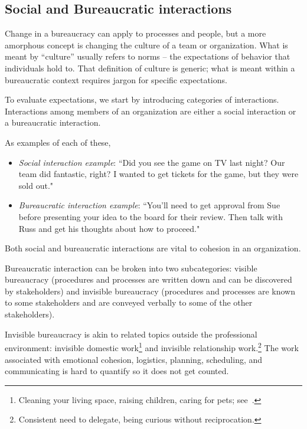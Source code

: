
\subsection*{Social and Bureaucratic interactions\label{sec:socializing}}

Change in a bureaucracy can apply to processes and people, but a more amorphous concept is changing the culture of a team or organization. What is meant by ``culture'' usually refers to norms -- the expectations of behavior that individuals hold to. That definition of culture is generic; what is meant within a bureaucratic context requires jargon for specific expectations.

To evaluate expectations, we start by introducing categories of interactions. 
Interactions among members of an organization are either a social interaction or a bureaucratic interaction. 

As examples of each of these,
\begin{itemize}
\item \textit{Social interaction example}: ``Did you see the game on TV last night? Our team did fantastic, right? I wanted to get tickets for the game, but they were sold out."
\item \textit{Bureaucratic interaction example}: ``You'll need to get approval from Sue before presenting your idea to the board for their review. Then talk with Russ and get his thoughts about how to proceed."
\end{itemize}
Both social and bureaucratic interactions are vital to cohesion in an organization. 


Bureaucratic interaction can be broken into two subcategories: 
\gls{visible bureaucracy} \iftoggle{glossaryinmargin}{\marginpar{[Glossary]}}{}%
(procedures and processes are written down and can be discovered by stakeholders) and 
\gls{invisible bureaucracy} \iftoggle{glossaryinmargin}{\marginpar{[Glossary]}}{}%
(procedures and processes are known to some stakeholders and are conveyed verbally to some of the other stakeholders).

Invisible bureaucracy is akin to related topics outside the professional environment: invisible domestic work\footnote{Cleaning your living space, raising children, caring for pets; see~\cite{1987_Daniels}.} and invisible relationship work.\footnote{Consistent need to delegate, being curious without reciprocation.} The work associated with emotional cohesion, logistics, planning, scheduling, and communicating is hard to quantify so it does not get counted.


